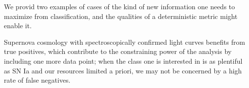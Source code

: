 We provid two examples of cases of the kind of new information one needs to maximize from classification, and the qualities of a deterministic metric might enable it.

Supernova cosmology with spectroscopically confirmed light curves benefits from true positives, which contribute to the constraining power of the analysis by including one more data point; when the class one is interested in is as plentiful as SN Ia and our resources limited a priori, we may not be concerned by a high rate of false negatives.



